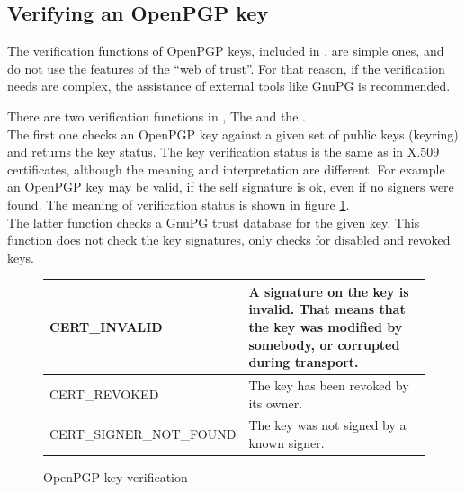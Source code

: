 \subsection*{Verifying an OpenPGP key}
The verification functions of OpenPGP keys, included in \gnutls{}, 
are simple ones, and do not use the features of the ``web of trust''.
For that reason, if the verification needs are complex, 
the assistance of external tools like GnuPG is recommended.
\par
There are two verification functions in \gnutls{},
The 
and the . 
\\
The first one checks an OpenPGP key against a given set of public keys (keyring) and
returns the key status. The key verification status is the same as in X.509 certificates,
although the meaning and interpretation are different. For example an OpenPGP key may
be valid, if the self signature is ok, even if no signers were found.
The meaning of verification status is shown in figure \ref{fig:pgp_verify}.
\\
The latter function checks a GnuPG trust database for the given key. This function does not
check the key signatures, only checks for disabled and revoked keys.

\begin{figure}[hbtp]
\begin{tabular}{|l|p{9cm}|}

\hline
CERT\_INVALID & A signature on the key is invalid. That means that the key was modified
by somebody, or corrupted during transport.
\\
\hline
CERT\_REVOKED & The key has been revoked by its owner.
\\
\hline
CERT\_SIGNER\_NOT\_FOUND & The key was not signed by a known signer.
\\
\hline
\end{tabular}
\caption{OpenPGP key verification}
\label{fig:pgp_verify}
\end{figure}


